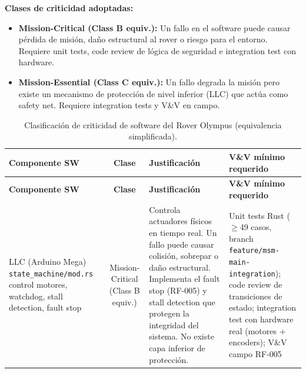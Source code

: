 \textbf{Clases de criticidad adoptadas:}
\begin{itemize}
    \item \textbf{Mission-Critical (Class B equiv.):} Un fallo en el software puede causar pérdida de misión, daño estructural al rover o riesgo para el entorno. Requiere unit tests, code review de lógica de seguridad e integration test con hardware.
    \item \textbf{Mission-Essential (Class C equiv.):} Un fallo degrada la misión pero existe un mecanismo de protección de nivel inferior (LLC) que actúa como safety net. Requiere integration tests y V\&V en campo.
\end{itemize}

\begin{landscape}
\centering
\small
\setlength{\tabcolsep}{4pt}
\renewcommand{\arraystretch}{1.3}
\begin{longtable}{| p{5.0cm} | c | p{9.5cm} | p{5.5cm} |}
\caption{Clasificación de criticidad de software del Rover Olympus \cite{nasa_std_8739_8} (equivalencia simplificada).}
\label{tab:sw_criticality}\\
\hline
\textbf{Componente SW} & \textbf{Clase} & \textbf{Justificación} & \textbf{V\&V mínimo requerido} \\ \hline
\endfirsthead
\hline
\textbf{Componente SW} & \textbf{Clase} & \textbf{Justificación} & \textbf{V\&V mínimo requerido} \\ \hline
\endhead
\hline
\endfoot
\hline
\endlastfoot

LLC \newline (Arduino Mega) \newline \texttt{state\_machine/mod.rs} \newline control motores, watchdog, \newline stall detection, fault stop &
Mission-Critical (Class B equiv.) &
Controla actuadores físicos en tiempo real. Un fallo puede causar colisión, sobrepar o daño estructural. Implementa el fault stop (RF-005) y stall detection que protegen la integridad del sistema. No existe capa inferior de protección. &
Unit tests Rust ($\ge$49 casos, branch \texttt{feature/msm-main-integration}); code review de transiciones de estado; integration test con hardware real (motores + encoders); V\&V campo RF-005 \\ \hline


\end{longtable}
\end{landscape}

